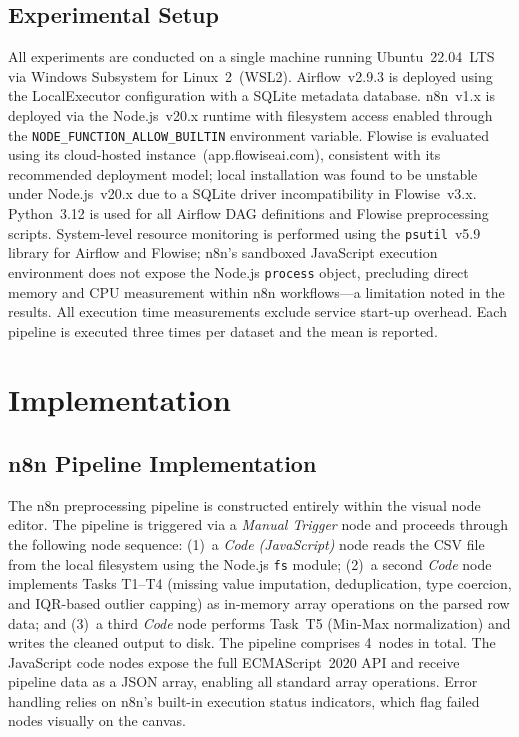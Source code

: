\documentclass[journal]{IEEEtran}
\begin{document}
\subsection{Experimental Setup}

All experiments are conducted on a single machine running Ubuntu~22.04~LTS
via Windows Subsystem for Linux~2~(WSL2). Airflow~v2.9.3 is deployed
using the LocalExecutor configuration with a SQLite metadata database.
n8n~v1.x is deployed via the Node.js~v20.x runtime with filesystem
access enabled through the \texttt{NODE\_FUNCTION\_ALLOW\_BUILTIN}
environment variable. Flowise is evaluated using its cloud-hosted
instance~(app.flowiseai.com), consistent with its recommended deployment
model; local installation was found to be unstable under Node.js~v20.x
due to a SQLite driver incompatibility in Flowise~v3.x.
Python~3.12 is used for all Airflow DAG definitions and Flowise
preprocessing scripts. System-level resource monitoring is performed
using the \texttt{psutil}~v5.9 library for Airflow and Flowise;
n8n's sandboxed JavaScript execution environment does not expose the
Node.js \texttt{process} object, precluding direct memory and CPU
measurement within n8n workflows---a limitation noted in the results.
All execution time measurements exclude service start-up overhead.
Each pipeline is executed three times per dataset and the mean is reported.


\section{Implementation}
\label{sec:implementation}

\subsection{n8n Pipeline Implementation}

The n8n preprocessing pipeline is constructed entirely within the visual
node editor. The pipeline is triggered via a \textit{Manual Trigger} node
and proceeds through the following node sequence: (1)~a \textit{Code
(JavaScript)} node reads the CSV file from the local filesystem using
the Node.js \texttt{fs} module; (2)~a second \textit{Code} node implements
Tasks T1--T4 (missing value imputation, deduplication, type coercion,
and IQR-based outlier capping) as in-memory array operations on the parsed
row data; and (3)~a third \textit{Code} node performs Task~T5 (Min-Max
normalization) and writes the cleaned output to disk. The pipeline
comprises 4~nodes in total. The JavaScript code nodes expose the full
ECMAScript~2020 API and receive pipeline data as a JSON array, enabling
all standard array operations. Error handling relies on n8n's built-in
execution status indicators, which flag failed nodes visually on the canvas.
\end{document}

